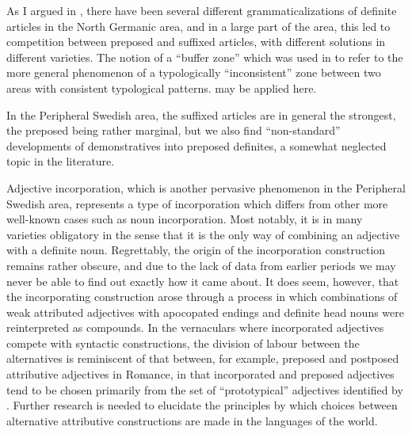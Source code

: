 \begin{styleBodytextC}
As I argued in \citet{Dahl2003}, there have been several different grammaticalizations of definite articles in the North Germanic area, and in a large part of the area, this led to competition between preposed and suffixed articles, with different solutions in different varieties. The notion of a “buffer zone” which was used in \citet{Stilo2004} to refer to the more general phenomenon of a typologically “inconsistent” zone between two areas with consistent typological patterns.  may be applied here.

\end{styleBodytextC}

\begin{styleBodytextC}
In the Peripheral Swedish area, the suffixed articles are in general the strongest, the preposed being rather marginal, but we also find “non-standard” developments of demonstratives into preposed definites, a somewhat neglected topic in the literature. 

\end{styleBodytextC}

\begin{styleBodytextC}
Adjective incorporation, which is another pervasive phenomenon in the Peripheral Swedish area, represents a type of incorporation which differs from other more well-known cases such as noun incorporation. Most notably, it is in many varieties obligatory in the sense that it is the only way of combining an adjective with a definite noun. Regrettably, the origin of the incorporation construction remains rather obscure, and due to the lack of data from earlier periods we may never be able to find out exactly how it came about. It does seem, however, that the incorporating construction arose through a process in which combinations of weak attributed adjectives with apocopated endings and definite head nouns were reinterpreted as compounds. In the vernaculars where incorporated adjectives compete with syntactic constructions, the division of labour between the alternatives is reminiscent of that between, for example, preposed and postposed attributive adjectives in Romance, in that incorporated and preposed adjectives tend to be chosen primarily from the set of “prototypical” adjectives identified by \citet{Dixon1977}. Further research is needed to elucidate the principles by which choices between alternative attributive constructions are made in the languages of the world.

\end{styleBodytextC}

